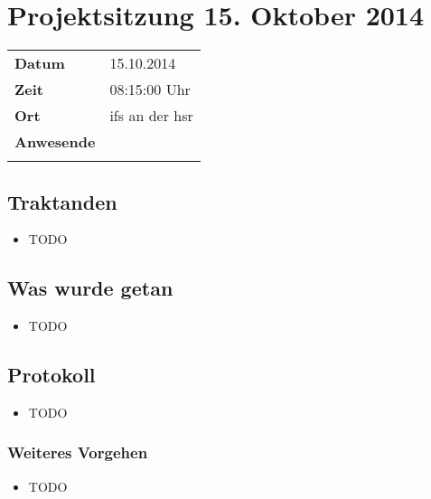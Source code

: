 \section{Projektsitzung 15. Oktober 2014}

\begin{tabular}{ll}
	\textbf{Datum} & 15.10.2014 \\
	\textbf{Zeit} & 08:15\textendash10:00 Uhr \\
	\textbf{Ort} & \gls{ifs} an der \gls{hsr} \\
	\textbf{Anwesende} & \proff \\ & \fscf
\end{tabular}

\subsection*{Traktanden}
\begin{itemize}
	\item TODO
\end{itemize}


\subsection*{Was wurde getan}
\begin{itemize}
	\item TODO
\end{itemize}


\subsection*{Protokoll}
\begin{itemize}
	\item TODO
\end{itemize}


\subsubsection*{Weiteres Vorgehen}
\begin{itemize}
\item TODO
\end{itemize}



